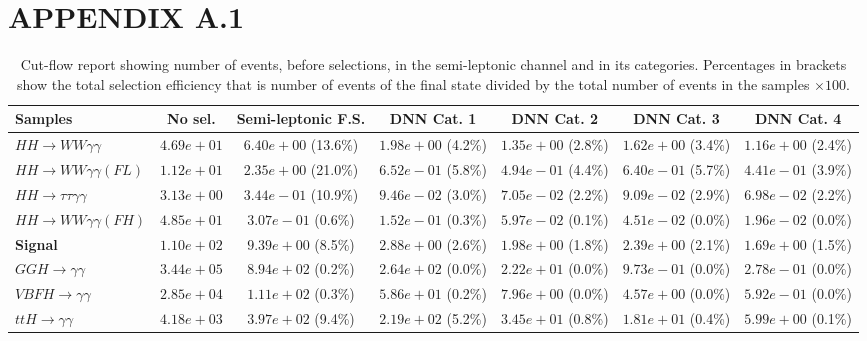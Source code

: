 \chapter{APPENDIX A.1}
\label{A1}

\begin{landscape}
\begin{table}[h!]
    \centering
    \caption{Cut-flow report showing number of events, before selections, in the semi-leptonic channel and in its categories. Percentages in brackets show the total selection efficiency that is number of events of the final state divided by the total number of events in the samples $\times 100$.}
\begin{tabular}{ |l|c|c|c|c|c|c| }
    \hline
    Samples                                & No sel.                   & Semi-leptonic F.S.               & DNN Cat. 1           & DNN Cat. 2          & DNN Cat. 3            & DNN Cat. 4            \\
    \hline
           $HH \rightarrow WW\gamma\gamma$ &  $4.69e+01$ &  $6.40e+00$ (13.6\%) &  $1.98e+00$ (4.2\%) &  $1.35e+00$ (2.8\%) &    $1.62e+00$ (3.4\%) &    $1.16e+00$ (2.4\%) \\
      $HH \rightarrow WW\gamma\gamma (FL)$ &  $1.12e+01$ &  $2.35e+00$ (21.0\%) &  $6.52e-01$ (5.8\%) &  $4.94e-01$ (4.4\%) &    $6.40e-01$ (5.7\%) &    $4.41e-01$ (3.9\%) \\
     $HH \rightarrow \tau\tau\gamma\gamma$ &  $3.13e+00$ &  $3.44e-01$ (10.9\%) &  $9.46e-02$ (3.0\%) &  $7.05e-02$ (2.2\%) &    $9.09e-02$ (2.9\%) &    $6.98e-02$ (2.2\%) \\
     $HH \rightarrow WW \gamma\gamma (FH)$ &  $4.85e+01$ &   $3.07e-01$ (0.6\%) &  $1.52e-01$ (0.3\%) &  $5.97e-02$ (0.1\%) &    $4.51e-02$ (0.0\%) &    $1.96e-02$ (0.0\%) \\
                           \textbf{Signal} &  $1.10e+02$ &   $9.39e+00$ (8.5\%) &  $2.88e+00$ (2.6\%) &  $1.98e+00$ (1.8\%) &    $2.39e+00$ (2.1\%) &    $1.69e+00$ (1.5\%) \\
            $GGH \rightarrow \gamma\gamma$ &  $3.44e+05$ &   $8.94e+02$ (0.2\%) &  $2.64e+02$ (0.0\%) &  $2.22e+01$ (0.0\%) &    $9.73e-01$ (0.0\%) &    $2.78e-01$ (0.0\%) \\
           $VBFH \rightarrow \gamma\gamma$ &  $2.85e+04$ &   $1.11e+02$ (0.3\%) &  $5.86e+01$ (0.2\%) &  $7.96e+00$ (0.0\%) &    $4.57e+00$ (0.0\%) &    $5.92e-01$ (0.0\%) \\
            $ttH \rightarrow \gamma\gamma$ &  $4.18e+03$ &   $3.97e+02$ (9.4\%) &  $2.19e+02$ (5.2\%) &  $3.45e+01$ (0.8\%) &    $1.81e+01$ (0.4\%) &    $5.99e+00$ (0.1\%) \\

\end{tabular}
\end{table}
\end{landscape}

